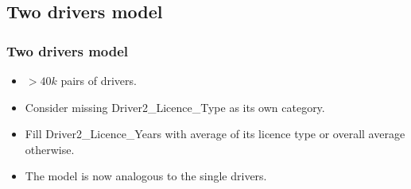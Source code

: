 \documentclass{beamer}
\theoremstyle{definition}
\begin{document}
\subsection{Two drivers model}
\begin{frame}
\frametitle{Two drivers model}
\begin{itemize}
\item<1-> $>40k$ pairs of drivers.
\item<2-> Consider missing Driver2\_Licence\_Type as its own category. %
\item<3-> Fill Driver2\_Licence\_Years with average of its licence type or overall average otherwise. %
\item<4-> The model is now analogous to the single drivers. %
\end{itemize}
\end{frame}
\end{document}
